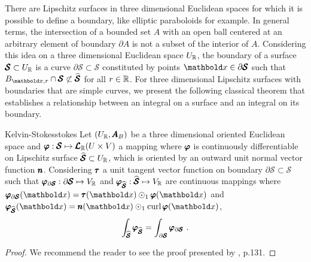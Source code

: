 There are Lipschitz surfaces in three dimensional Euclidean spaces for which it is possible to define a boundary, like elliptic paraboloids for example. In general terms, the intersection of a bounded set $A$ with an open ball centered at an arbitrary element of boundary $\partial A$ is not a subset of the interior of $A$. Considering this idea on a three dimensional Euclidean space $U_{\mathbb{R}}$, the boundary of a surface $\pmb{\mathcal{S}}\subset U_{\mathbb{R}}$ is a curve $\partial\pmb{\mathcal{S}}\subset\pmb{\mathcal{S}}$ constituted by points $\vto{x}\in\partial\pmb{\mathcal{S}}$ such that $B_{\vto{x},r}\cap\pmb{\mathcal{S}}\not\subset\widehat{\pmb{\mathcal{S}}}$ for all $r\in\mathbb{R}$. For three dimensional Lipschitz surfaces with boundaries that are simple curves, we present the following classical theorem that establishes a relationship between an integral on a surface and an integral on its boundary.

\begin{mteo}{Kelvin-Stokes}{stokes}
Let $(U_{\mathbb{R}},\pmb{A}_B)$ be a three dimensional oriented Euclidean space and $\pmb{\varphi} : \pmb{\mathcal{S}} \mapsto \pmb{\mathcal{L}}_{\mathbb{R}}(U\times V)$ a mapping where  $\pmb{\varphi}$ is continuously differentiable on Lipschitz surface $\widehat{\pmb{\mathcal{S}}}\subset U_{\mathbb{R}}$, which is oriented by an outward unit normal vector function $\pmb{n}$. Considering $\pmb{\tau}$ a unit tangent vector function on boundary $\partial\pmb{\mathcal{S}}\subset\pmb{\mathcal{S}}$ such that $\pmb{\varphi}_{\partial\pmb{\mathcal{S}}} : \partial\pmb{\mathcal{S}} \mapsto V_{\mathbb{R}}$ and $\pmb{\varphi}_{\widehat{\pmb{\mathcal{S}}}} : \widehat{\pmb{\mathcal{S}}} \mapsto V_{\mathbb{R}}$ are continuous mappings where $\fua{\vtf{\varphi}_{\partial\pmb{\mathcal{S}}}}{\vto{x}}=\fua{\vtf{\tau}}{\vto{x}}\odot_1\fua{\vtf{\varphi}}{\vto{x}}$ and $\fua{\vtf{\varphi}_{\widehat{\pmb{\mathcal{S}}}}}{\vto{x}}=\fua{\vtf{n}}{\vto{x}}\odot_1\fua{\crl{\vtf{\varphi}}}{\vto{x}}$,
\begin{equation*}
\int_{\widehat{{\pmb{\mathcal{S}}}}}\pmb{\varphi}_{\widehat{\pmb{\mathcal{S}}}} = \int_{\partial{\pmb{\mathcal{S}}}}\pmb{\varphi}_{\partial\pmb{\mathcal{S}}}\,\,.
\end{equation*}
\end{mteo}
{\footnotesize
\begin{proof}
We recommend the reader to see the proof presented by \cite{backus_1997_1}, p.131. 
\end{proof}
}

